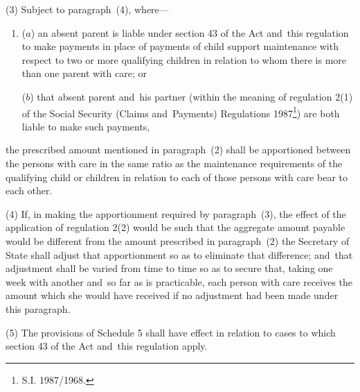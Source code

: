 \documentclass[12pt,a4paper]{article}
\begin{document}
(3) Subject to paragraph~(4), where—
\begin{enumerate}\item[]
($a$) an absent parent is liable under section 43 of the Act and~this regulation to make payments in place of payments of child support maintenance with respect to two or more qualifying children in relation to whom there is more than one parent with care; or

($b$) that absent parent and~his partner (within the meaning of regulation 2(1) of the Social Security (Claims and~Payments) Regulations 1987\footnote{\frenchspacing S.I. 1987/1968.}) are both liable to make such payments,
\end{enumerate}
the prescribed amount mentioned in paragraph~(2) shall be apportioned between the persons with care in the same ratio as the maintenance requirements of the qualifying child or children in relation to each of those persons with care bear to each other.

(4) If, in making the apportionment required by paragraph~(3), the effect of the application of regulation 2(2) would be such that the aggregate amount payable would be different from the amount prescribed in paragraph~(2) the Secretary of State shall adjust that apportionment so as to eliminate that difference; and~that adjustment shall be varied from time to time so as to secure that, taking one week with another and~so far as is practicable, each person with care receives the amount which she would have received if no adjustment had been made under this paragraph.

(5) The provisions of Schedule 5 shall have effect in relation to cases to which section 43 of the Act and~this regulation apply.

\end{document}
